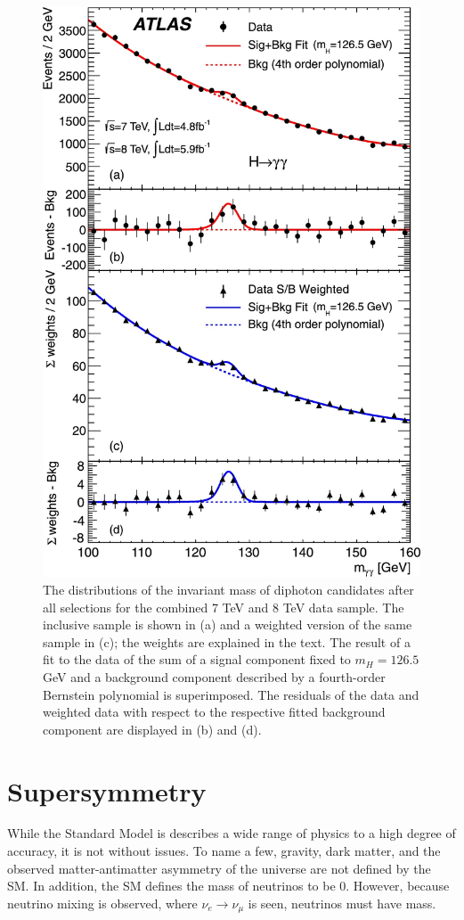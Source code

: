 		\begin{figure}[!ht]
		\centering
		\includegraphics[width=.7\textwidth,keepaspectratio=true]{chapters/chapter1_theory/images/Higgs_Discovery_gam_gam.jpeg}
		\caption{The distributions of the invariant mass of diphoton candidates after all selections for the combined 7 TeV and 8 TeV data sample. The inclusive sample is shown in (a) and a weighted version of the same sample in (c); the weights are explained in the text. The result of a fit to the data of the sum of a signal component fixed to $m_H=126.5$ GeV  and a background component described by a fourth-order Bernstein polynomial is superimposed. The residuals of the data and weighted data with respect to the respective fitted background component are displayed in (b) and (d).}
		\label{fig:higgs-discovery}
		\end{figure}

\section{Supersymmetry}\label{sec:SUSY}
	While the Standard Model is describes a wide range of physics to a high degree of accuracy, it is not without issues. To name a few, gravity, dark matter, and the observed matter-antimatter asymmetry of the universe are not defined by the SM. In addition, the SM defines the mass of neutrinos to be 0. However, because neutrino mixing is observed, where $\nu_e \rightarrow \nu_\mu$ is seen, neutrinos must have mass. 

